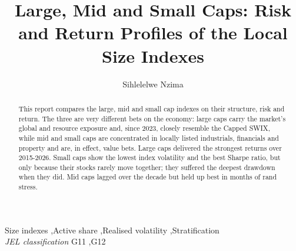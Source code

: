 \documentclass[11pt,preprint]{elsarticle}
\numberwithin{equation}{section}
\numberwithin{figure}{section}
\numberwithin{table}{section}
\begin{document}
\begin{frontmatter}  %

\title{Large, Mid and Small Caps: Risk and Return Profiles of the Local
Size Indexes}





\author[Add1]{Sihlelelwe Nzima}
\ead{}





\address[Add1]{Stellenbosch University, Stellenbosch, South Africa}


\begin{abstract}
\small{
This report compares the large, mid and small cap indexes on their
structure, risk and return. The three are very different bets on the
economy: large caps carry the market's global and resource exposure and,
since 2023, closely resemble the Capped SWIX, while mid and small caps
are concentrated in locally listed industrials, financials and property
and are, in effect, value bets. Large caps delivered the strongest
returns over 2015-2026. Small caps show the lowest index volatility and
the best Sharpe ratio, but only because their stocks rarely move
together; they suffered the deepest drawdown when they did. Mid caps
lagged over the decade but held up best in months of rand stress.
}
\end{abstract}

\vspace{1cm}


\begin{keyword}
\footnotesize{
Size indexes \sep Active share \sep Realised volatility
\sep Stratification \\
\vspace{0.3cm}
}
\footnotesize{
\textit{JEL classification} G11 \sep G12
}
\end{keyword}



\vspace{0.5cm}

\end{frontmatter}

\setcounter{footnote}{0}



\pagestyle{fancy}
\chead{}
\rhead{}
\lfoot{}
\lhead{}
\cfoot{}
\end{document}
